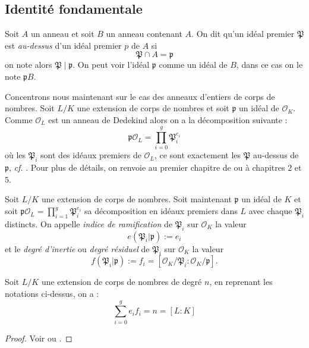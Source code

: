\documentclass[a4paper]{article} %
\numberwithin{section}{part}
\numberwithin{equation}{section}
\newcommand\EO{\mathcal{O}}
\begin{document}
\subsection{Identité fondamentale}
Soit $A$ un anneau et soit $B$ un anneau contenant $A$. On dit qu'un idéal
premier $\mathfrak{P}$ est \emph{au-dessus} d'un idéal premier $p$ de $A$ si 
\begin{equation}
\mathfrak{P}\cap A = \mathfrak{p}
\end{equation}
on note alors $\mathfrak{P}\mid\mathfrak{p}$. On peut voir l'idéal
$\mathfrak{p}$ comme un idéal de $B$, dans ce cas on le note
$\mathfrak{p}B$.\par
Concentrons nous maintenant sur le cas des anneaux d'entiers de corps de
nombres. Soit $L/K$ une extension de corps de nombres et soit $\mathfrak{p}$ un
idéal de $\EO_K$. Comme $\EO_L$ est un anneau de Dedekind alors on a la
décomposition suivante :
\begin{equation}
\mathfrak{p}\EO_L = \prod_{i=0}^g{\mathfrak{P}_i^{e_i}}
\end{equation}
où les $\mathfrak{P}_i$ sont des idéaux premiers de $\EO_L$, ce sont exactement 
les $\mathfrak{P}$ au-dessus de $\mathfrak{p}$, \emph{cf.} \cite[p. 84]{Sam}. 
Pour plus de détails, on renvoie au premier chapitre de \cite{Lan1} ou à 
\cite{Sam} chapitres $2$ et $5$.
\begin{defn}
Soit $L/K$ une extension de corps de nombres. Soit maintenant $\mathfrak{p}$ un 
idéal de $K$ et soit $\mathfrak{p}\EO_L = \prod_{i=1}^{g}{\mathfrak{P}_i^{e_i}}$
sa décomposition en idéaux premiers dans $L$ avec chaque $\mathfrak{P}_i$
distincts. On appelle \emph{indice de ramification} de $\mathfrak{P}_i$ sur 
$\EO_K$ la valeur 
\begin{equation}
e(\mathfrak{P}_i\vert \mathfrak{p}) := e_i
\end{equation}
et le \emph{degré d'inertie} ou \emph{degré résiduel} de $\mathfrak{P}_i$ sur
$\EO_K$ la valeur
\begin{equation}
f(\mathfrak{P}_i\vert \mathfrak{p}) := f_i =
[\EO_K/\mathfrak{P}_i:\EO_K/\mathfrak{p}].
\end{equation}
\end{defn}

\begin{thm}
\label{th:fundid}
Soit $L/K$ une extension de corps de nombres de degré $n$, en reprenant les 
notations ci-dessus, on a :
\begin{equation}
\sum_{i=0}^g{e_if_i} = n = [L:K]
\end{equation}
\end{thm}
\begin{proof}
Voir \cite[p. 24, prop. 21]{Lan2} ou \cite[p. 85]{Sam}.
\end{proof}
\end{document}
